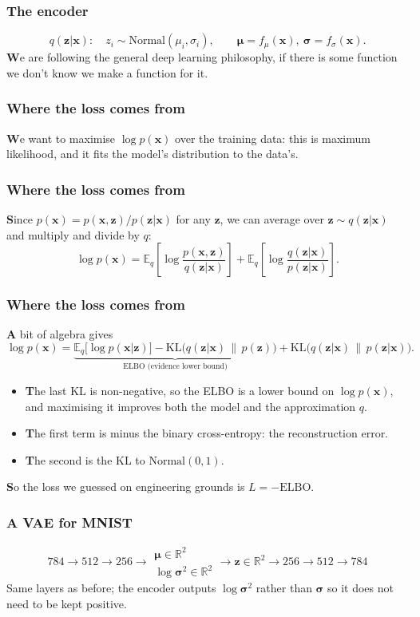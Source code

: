 \documentclass{beamer}
\begin{document}
\begin{frame}
  \frametitle{The encoder}
\vfill
$$
q(\mathbf{z}|\mathbf{x}):\quad z_i\sim\text{Normal}(\mu_i,\sigma_i),\qquad \boldsymbol{\mu}=f_\mu(\mathbf{x}),\ \boldsymbol{\sigma}=f_\sigma(\mathbf{x}).
$$
\textbf{W}e are following the general deep learning philosophy, if there is some function we don't know we make a function for it. 
\vfill
\end{frame}

\begin{frame}
  \frametitle{Where the loss comes from}
\vfill
\textbf{W}e want to maximise $\log p(\mathbf{x})$ over the training data: this is maximum likelihood, and it fits the model's distribution to the data's.
\vfill
\end{frame}

\begin{frame}
  \frametitle{Where the loss comes from}
\vfill
\textbf{S}ince $p(\mathbf{x})=p(\mathbf{x},\mathbf{z})/p(\mathbf{z}|\mathbf{x})$ for any $\mathbf{z}$, we can average over $\mathbf{z}\sim q(\mathbf{z}|\mathbf{x})$ and multiply and divide by $q$:
$$
\log p(\mathbf{x})
=\mathbb{E}_q\left[\log\frac{p(\mathbf{x},\mathbf{z})}{q(\mathbf{z}|\mathbf{x})}\right]
+\mathbb{E}_q\left[\log\frac{q(\mathbf{z}|\mathbf{x})}{p(\mathbf{z}|\mathbf{x})}\right].
$$
\vfill
\end{frame}

\begin{frame}
  \frametitle{Where the loss comes from}
\vskip 0.25cm
\textbf{A} bit of algebra gives
$$
\log p(\mathbf{x})=\underbrace{\mathbb{E}_{q}\big[\log p(\mathbf{x}|\mathbf{z})\big]-\mathrm{KL}\big(q(\mathbf{z}|\mathbf{x})\,\|\,p(\mathbf{z})\big)}_{\text{ELBO (evidence lower bound)}}+\mathrm{KL}\big(q(\mathbf{z}|\mathbf{x})\,\|\,p(\mathbf{z}|\mathbf{x})\big).
$$
\begin{itemize}
\item \textbf{T}he last KL is non-negative, so the ELBO is a lower bound on $\log p(\mathbf{x})$, and maximising it improves both the model and the approximation $q$.
\item \textbf{T}he first term is minus the binary cross-entropy: the reconstruction error.
\item \textbf{T}he second is the KL to $\text{Normal}(0,1)$.
\end{itemize}
\vskip 0.25cm
\textbf{S}o the loss we guessed on engineering grounds is $L=-\text{ELBO}$.
\end{frame}


  \begin{frame}
    \frametitle{A VAE for MNIST}
  \vfill
  $$
  784 \rightarrow 512 \rightarrow 256 \rightarrow
  \begin{array}{c}\boldsymbol{\mu}\in\mathbb{R}^2\\ \log\boldsymbol{\sigma}^2\in\mathbb{R}^2\end{array}
  \rightarrow \mathbf{z}\in\mathbb{R}^2 \rightarrow 256 \rightarrow 512 \rightarrow 784
  $$
  \vfill
  Same layers as before; the encoder outputs $\log\boldsymbol{\sigma}^2$ rather than $\boldsymbol{\sigma}$ so it does not need to be kept positive.
  \vfill
  \end{frame}
\end{document}
